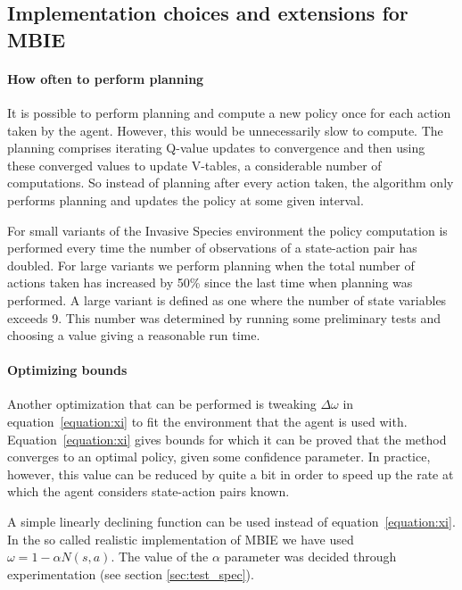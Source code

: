 \subsection{Implementation choices and extensions for MBIE}
\label{sec:MBIE_our_contribution}

\paragraph{How often to perform planning}
\label{sec:mbie_perform_planning}

It is possible to perform planning and compute a new policy once for each
action taken by the agent. However, this would be unnecessarily slow to
compute. The planning comprises iterating Q-value updates to convergence and
then using these converged values to update V-tables, a considerable number of
computations. So instead of planning after every action taken, the algorithm
only performs planning and updates the policy at some given interval. 

For small variants of the Invasive Species environment the policy computation
is performed every time the number of observations of a state-action pair has
doubled. For large variants we perform planning when the total number of
actions taken has increased by 50\% since the last time when planning was performed. A large variant is defined as one where the
number of state variables exceeds 9. This number was determined by running some
preliminary tests and choosing a value giving a reasonable run time.

\paragraph{Optimizing bounds}

Another optimization that can be performed is tweaking $\Delta \omega$ in
equation~\eqref{equation:xi} to fit the environment that the agent is used
with. Equation~\eqref{equation:xi} gives bounds for which it can be proved that
the method converges to an optimal policy, given some confidence parameter. In
practice, however, this value can be reduced by quite a bit in order to speed
up the rate at which the agent considers state-action pairs known. 

A simple linearly declining function can be used instead of
equation~\eqref{equation:xi}. In the so called realistic implementation of MBIE
we have used $\omega = 1 - \alpha N(s,a).$ The value of the $\alpha$ parameter
was decided through experimentation (see section \ref{sec:test_spec}).

